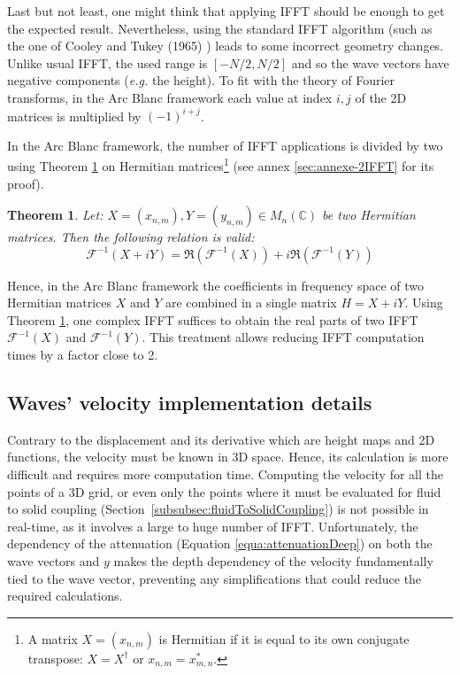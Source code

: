 \documentclass[11pt]{article}
\newtheorem{theorem}{Theorem}
\def\framework{the Arc Blanc framework\xspace}
\begin{document}



Last but not least, one might think that applying IFFT should be enough to get the expected result.
Nevertheless, using the standard IFFT algorithm (such as the one of Cooley and Tukey (1965) \cite{cooleyAlgorithmMachineCalculation1965}) leads to some incorrect geometry changes.
Unlike usual IFFT, the used range is $\left[-N/2, N/2\right]$ and so the wave vectors have negative components (\emph{e.g.} the height).
To fit with the theory of Fourier transforms, in \framework each value at index $i,j$ of the 2D matrices is multiplied by $(-1)^{i+j}$.

In \framework, the number of IFFT applications is divided by two using Theorem \ref{theorem:ifft} on Hermitian matrices\footnote{A matrix $X=(x_{n,m})$ is Hermitian if it is equal to its own conjugate transpose: $X = X^{\dagger}$ or $x_{n,m}=x^*_{m,n}$.} (see annex \ref{sec:annexe-2IFFT} for its proof).
\begin{theorem}
	\label{theorem:ifft}
	Let: $X=(x_{n,m}), Y=(y_{n,m}) \in M_n(\mathbb{C})$ be two Hermitian matrices.
	Then the following relation is valid:
	\begin{equation}
		\mathcal{F}^{-1}\left(X+iY\right) =
		\Re\left(\mathcal{F}^{-1}\left(X\right)\right)
		+ i\Re\left(\mathcal{F}^{-1}\left(Y\right)\right)
	\end{equation}
\end{theorem}
Hence, in \framework the coefficients in frequency space of two Hermitian matrices $X$ and $Y$ are combined in a single matrix $H=X+iY$.
Using Theorem \ref{theorem:ifft}, one complex IFFT suffices to obtain the real parts of two IFFT $\mathcal{F}^{-1}\left(X\right)$ and $\mathcal{F}^{-1}\left(Y\right)$.
This treatment allows reducing IFFT computation times by a factor close to 2.

\subsection{Waves' velocity implementation details}
Contrary to the displacement and its derivative which are height maps and 2D functions, the velocity must be known in 3D space.
Hence, its calculation is more difficult and requires more computation time.
Computing the velocity for all the points of a 3D grid, or even only the points where it must be evaluated for fluid to solid coupling (Section~\ref{subsubsec:fluidToSolidCoupling}) is not possible in real-time, as it involves a large to huge number of IFFT.
Unfortunately, the dependency of the attenuation (Equation \ref{equa:attenuationDeep}) on both the wave vectors and $y$ makes the depth dependency of the velocity fundamentally tied to the wave vector, preventing any simplifications that could reduce the required calculations.
\end{document}
